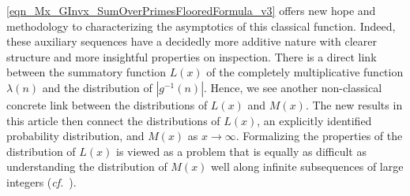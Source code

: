 \documentclass[10pt,reqno,letterpaper]{article}
\theoremstyle{plain}
\numberwithin{theorem}{section}
\theoremstyle{definition}
\newcommand{\cf}[0]{\emph{cf.}\ }
\begin{document}
\eqref{eqn_Mx_GInvx_SumOverPrimesFlooredFormula_v3} 
offers new hope and methodology to characterizing the asymptotics of this classical function. 
Indeed, these auxiliary sequences have a decidedly more additive nature with clearer structure and 
more insightful properties on inspection. 
There is a direct link between 
the summatory function $L(x)$ of the completely multiplicative function 
$\lambda(n)$ and the distribution of 
$|g^{-1}(n)|$. Hence, we see another non-classical 
concrete link between the distributions of $L(x)$ and $M(x)$. 
The new results in this article then 
connect the distributions of $L(x)$, an explicitly identified 
probability distribution, and $M(x)$ as $x \rightarrow \infty$.
Formalizing the properties of the distribution of 
$L(x)$ is viewed as a problem that is equally as difficult 
as understanding the distribution of $M(x)$ well along infinite 
subsequences of large integers 
(\cf \cite{HUMPHRIES-JNT-2013}). 
\end{document}
